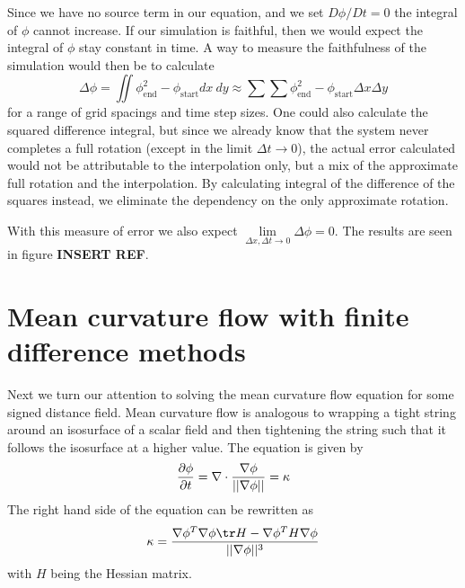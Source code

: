 \documentclass[sigconf]{acmart}
\begin{document}
Since we have no source term in our equation, and we set $ D\phi/Dt = 0$ the integral of $ \phi $ cannot increase. If our simulation is faithful, then we would expect the integral of $ \phi $ stay constant in time. A way to measure the faithfulness of the simulation would then be to calculate
\begin{equation}\label{key}
	\Delta\phi = \iint \phi_{\text{end}}^2 - \phi_{\text{start}} dx\ dy \approx \sum\sum \phi_{\text{end}}^2 - \phi_{\text{start}} \Delta x \Delta y
\end{equation}
for a range of grid spacings and time step sizes. One could also calculate the squared difference integral, but since we already know that the system never completes a full rotation (except in the limit $ \Delta t \to 0 $), the actual error calculated would not be attributable to the interpolation only, but a mix of the approximate full rotation and the interpolation. By calculating integral of the difference of the squares instead, we eliminate the dependency on the only approximate rotation.

With this measure of error we also expect $ \lim\limits_{\Delta x, \Delta t \to 0} \Delta \phi = 0 $. The results are seen in figure \textbf{INSERT REF}.





\section{Mean curvature flow with finite difference methods}
Next we turn our attention to solving the mean curvature flow equation for some signed distance field. Mean curvature flow is analogous to wrapping a tight string around an isosurface of a scalar field and then tightening the string such that it follows the isosurface at a higher value. The equation is given by
\begin{equation}\label{key}
	\frac{\partial \phi}{\partial t} = \nabla \cdot \frac{\nabla \phi}{||\nabla \phi ||} = \kappa
\end{equation}
The right hand side of the equation can be rewritten as
\begin{equation}\label{key}
	\kappa = \frac{\grad \phi^T \grad \phi \tr H  - \grad\phi^T H \grad\phi}{||\grad\phi||^3}
\end{equation}
with $ H $ being the Hessian matrix.
\end{document}
